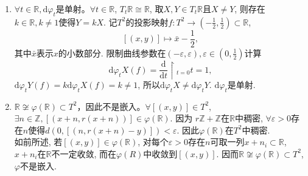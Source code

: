 \documentclass{article}%
\theoremstyle{remark}
\def\r{\mathbb{R}}
\def\res{\!\upharpoonright\!}
\def\dif{\mathrm{d}}
\begin{document}
\begin{enumerate}
\begin{enumerate}
    \item $\forall t\in \r, \dif\varphi_t$是单射。$\forall t\in \r$, $T_t\r\cong\r$, 取$X,Y\in T_t\r$且$X\neq Y$, 则存在$k\in\r,k\neq 1$使得$Y=kX$. 记$T^2$的投影映射$f: T^2\to (-\frac{1}{2},\frac{1}{2})\subset\r$,
    $$[(x,y)]\mapsto \bar{x}-\frac{1}{2},$$
    其中$\bar{x}$表示$x$的小数部分. 限制曲线参数在$(-\varepsilon,\varepsilon),\varepsilon\in(0,\frac{1}{2})$计算
    $$\dif\varphi_t X (f)=\frac{\dif}{\dif t}\res_{t=0}t=1,$$
    $\dif\varphi_t Y (f)=k \dif\varphi_t X (f)=k\neq 1$, 所以$\dif\varphi_t X\neq \dif\varphi_t Y$. $\dif\varphi_t$是单射.
    \item $\r\not\cong \varphi(\r)\subset T^2$，因此不是嵌入。$\forall [(x,y)]\in T^2$, $\exists n\in\mathbb{Z}, [(x+n,r(x+n))]\in \varphi(\r)$. 因为 $r\mathbb{Z}+\mathbb{Z}$在$\r$中稠密, $\forall \varepsilon>0$存在$n$使得$d(0,[(n,r(x+n)-y)])<\varepsilon$. 因此$\varphi(\r)$在$T^2$中稠密. 
    \\如前所述, 若$[(x,y)]\in\varphi(\r)$, 对每个$\varepsilon>0$存在$n$可取一列${x+n_i}\subset\r$, ${x+n_i}$在$\r$不一定收敛, 而在$\varphi(R)$中收敛到$[(x,y)]$. 因而$\r\not\cong \varphi(\r)\subset T^2$, $\varphi$不是嵌入.
\end{enumerate}
\endps
\end{enumerate}
\end{document}
